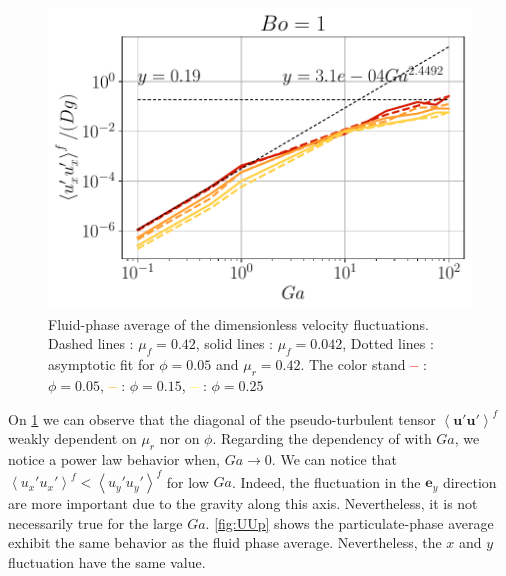 \begin{figure}[h!]
    \includegraphics[height=0.20\textheight]{image/N_10/UU/UU_fxx_Bo_1.pdf}
    \caption{Fluid-phase average of the dimensionless velocity fluctuations. Dashed lines : $\mu_f = 0.42$, solid lines : $\mu_f = 0.042$, Dotted lines : asymptotic fit for $\phi = 0.05$ and $\mu_r = 0.42$. The color stand  \textcolor{red}{\textbf{--}} : $\phi = 0.05$, \textcolor{orange}{\textbf{--}} : $\phi = 0.15$, \textcolor{yellow}{\textbf{--}} : $\phi = 0.25$} 
    \label{fig:UUf}
\end{figure} 
On \ref{fig:UUf} we can observe that the diagonal of the pseudo-turbulent tensor $\left<\bm{u'u'}\right>^f$ weakly dependent on $\mu_r$ nor on $\phi$.
Regarding the dependency of  with $Ga$, we notice a power law behavior when, $Ga \rightarrow 0$. 
We can notice that $\left<{u_x'u_x'}\right>^f  < \left<{u_y'u_y'}\right>^f$ for low $Ga$.
Indeed, the fluctuation in the $\bm{e}_y$ direction are more important due to the gravity along this axis.  
Nevertheless, it is not necessarily true for the large $Ga$. 
\ref{fig:UUp} shows the particulate-phase average exhibit the same behavior as the fluid phase average. 
Nevertheless, the $x$ and $y$ fluctuation have the same value.
